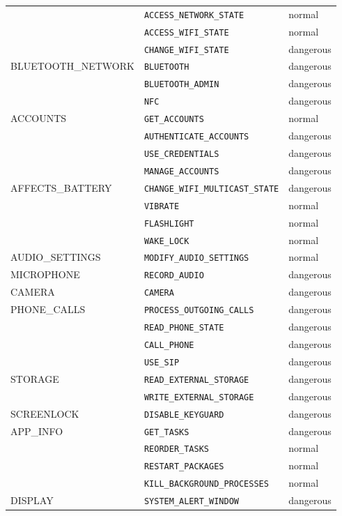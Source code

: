 \documentclass[
  a4paper,  %
  twoside,  %
  bibliography=totoc,
  headsepline,
  cleardoublepage=empty,
  parskip=half,
  draft=false,
  open=any
]{scrbook}
\begin{document}
\begin{longtable}{|p{5cm}|p{6cm}|p{1.7cm}|}
	& \texttt{ACCESS\_NETWORK\_STATE} & normal \\
	& \texttt{ACCESS\_WIFI\_STATE} & normal \\
	& \texttt{CHANGE\_WIFI\_STATE} & dangerous \\
	\hline
	BLUETOOTH\_NETWORK & \texttt{BLUETOOTH} & dangerous \\
	& \texttt{BLUETOOTH\_ADMIN} & dangerous \\
	& \texttt{NFC} & dangerous \\
	\hline
	ACCOUNTS & \texttt{GET\_ACCOUNTS} & normal \\
	& \texttt{AUTHENTICATE\_ACCOUNTS} & dangerous \\
	& \texttt{USE\_CREDENTIALS} & dangerous \\
	& \texttt{MANAGE\_ACCOUNTS} & dangerous \\
	\hline
	AFFECTS\_BATTERY & \texttt{CHANGE\_WIFI\_MULTICAST\_STATE} & dangerous \\
	& \texttt{VIBRATE} & normal \\
	& \texttt{FLASHLIGHT} & normal\\
	& \texttt{WAKE\_LOCK} & normal \\
	\hline
	AUDIO\_SETTINGS & \texttt{MODIFY\_AUDIO\_SETTINGS} & normal \\
	\hline
	MICROPHONE & \texttt{RECORD\_AUDIO} & dangerous \\
	\hline
	CAMERA & \texttt{CAMERA} & dangerous \\
	\hline
	PHONE\_CALLS & \texttt{PROCESS\_OUTGOING\_CALLS} & dangerous \\
	& \texttt{READ\_PHONE\_STATE} & dangerous \\
	& \texttt{CALL\_PHONE} & dangerous \\
	& \texttt{USE\_SIP} & dangerous \\	
	\hline
	STORAGE & \texttt{READ\_EXTERNAL\_STORAGE} & dangerous \\
	& \texttt{WRITE\_EXTERNAL\_STORAGE} & dangerous \\
	\hline
	SCREENLOCK & \texttt{DISABLE\_KEYGUARD} & dangerous \\
	\hline
	APP\_INFO & \texttt{GET\_TASKS} & dangerous \\
	& \texttt{REORDER\_TASKS} & normal \\
	& \texttt{RESTART\_PACKAGES} & normal \\
	& \texttt{KILL\_BACKGROUND\_PROCESSES} & normal \\
	\hline
	DISPLAY & \texttt{SYSTEM\_ALERT\_WINDOW} & dangerous \\

\end{longtable}
\end{document}
